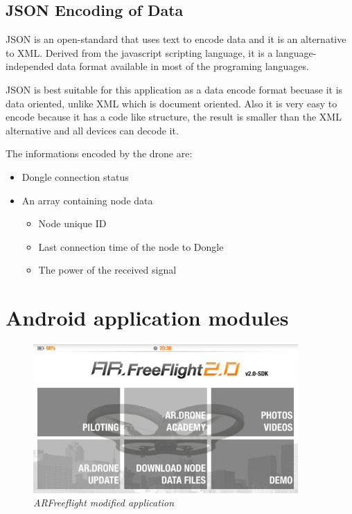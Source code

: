 \subsection{JSON Encoding of Data} \cite{json}

JSON is an open-standard that uses text to encode data and it is an alternative to XML. Derived from the javascript scripting language, it is a language-independed data format available in most of the programing languages.

JSON is best suitable for this application as a data encode format becuase it is data oriented, unlike XML which is document oriented. Also it is very easy to encode because it has a code like structure, the result is smaller than the XML alternative and all devices can decode it. 

The informations encoded by the drone are:
\begin{itemize}

\item Dongle connection status
\item An array containing node data
\begin{itemize}

	\item Node unique ID
	\item Last connection time of the node to Dongle
	\item The power of the received signal

	\end{itemize}
\end{itemize}
 


\section{Android application modules}

\begin{figure}[ht]
\begin{center}
\includegraphics[width=0.9\textwidth]{implementation/android_app.png}
\end{center}
\caption{\small \itshape{ARFreeflight modified application}}
\end{figure}

